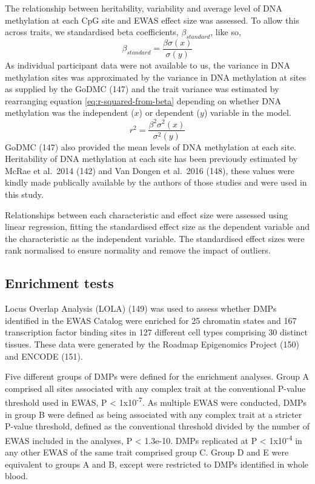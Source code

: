 \documentclass[11pt,oneside]{bristolthesis}
\begin{document}
The relationship between heritability, variability and average level of DNA methylation at each CpG site and EWAS effect size was assessed. To allow this across traits, we standardised beta coefficients, \(\beta_{standard}\), like so,
\begin{equation}
    \beta_{standard} = \frac{\beta\sigma(x)} {\sigma(y)}
    \label{eq:standardised-beta-coeffs}
\end{equation}
As individual participant data were not available to us, the variance in DNA methylation sites was approximated by the variance in DNA methylation at sites as supplied by the GoDMC (147) and the trait variance was estimated by rearranging equation \eqref{eq:r-squared-from-beta} depending on whether DNA methylation was the independent (\(x\)) or dependent (\(y\)) variable in the model.
\begin{equation}
    r^2 = \frac{\beta^2\sigma^2(x)} {\sigma^2(y)}
    \label{eq:r-squared-from-beta}
\end{equation}
GoDMC (147) also provided the mean levels of DNA methylation at each site. Heritability of DNA methylation at each site has been previously estimated by McRae et al.~2014 (142) and Van Dongen et al.~2016 (148), these values were kindly made publically available by the authors of those studies and were used in this study.

Relationships between each characteristic and effect size were assessed using linear regression, fitting the standardised effect size as the dependent variable and the characteristic as the independent variable. The standardised effect sizes were rank normalised to ensure normality and remove the impact of outliers.

\hypertarget{enrichment-tests}{%
\subsection{Enrichment tests}\label{enrichment-tests}}

Locus Overlap Analysis (LOLA) (149) was used to assess whether DMPs identified in the EWAS Catalog were enriched for 25 chromatin states and 167 transcription factor binding sites in 127 different cell types comprising 30 distinct tissues. These data were generated by the Roadmap Epigenomics Project (150) and ENCODE (151).

Five different groups of DMPs were defined for the enrichment analyses. Group A comprised all sites associated with any complex trait at the conventional P-value threshold used in EWAS, P \textless{} 1x10\textsuperscript{-7}. As multiple EWAS were conducted, DMPs in group B were defined as being associated with any complex trait at a stricter P-value threshold, defined as the conventional threshold divided by the number of EWAS included in the analyses, P \textless{} 1.3e-10. DMPs replicated at P \textless{} 1x10\textsuperscript{-4} in any other EWAS of the same trait comprised group C. Group D and E were equivalent to groups A and B, except were restricted to DMPs identified in whole blood.
\end{document}
